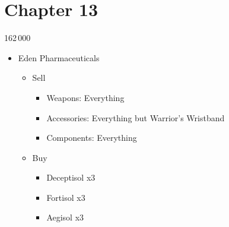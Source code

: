 \chapter{Chapter 13}

	\begin{shop}{162\,000}
		\begin{itemize}
			\item Eden Pharmaceuticals
			      \begin{itemize}
				      \item Sell
				            \begin{itemize}
					            \item Weapons: Everything
					            \item Accessories: Everything but Warrior's Wristband
					            \item Components: Everything
				            \end{itemize}
				      \item Buy
				            \begin{itemize}
					            \item Deceptisol x3
					            \item Fortisol x3
					            \item Aegisol x3
				            \end{itemize}
			      \end{itemize}
		\end{itemize}
	\end{shop}


